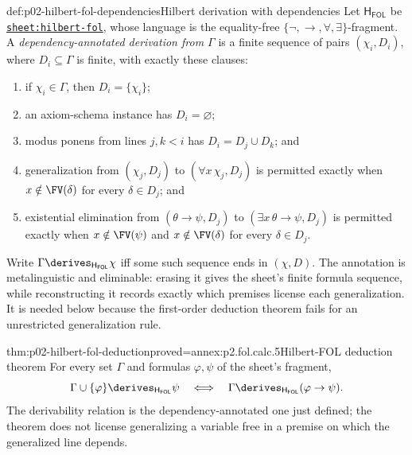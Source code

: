 \begin{hbdefinition}{def:p02-hilbert-fol-dependencies}{Hilbert derivation with dependencies}
Let \(\mathsf H_{\mathsf{FOL}}\) be
\hyperref[sheet:hilbert-fol]{\texttt{sheet:hilbert-fol}}, whose language is
the equality-free \(\{\neg,\to,\forall,\exists\}\)-fragment.  A
\emph{dependency-annotated derivation from \(\Gamma\)}
 is a finite sequence
of pairs \((\chi_i,D_i)\), where \(D_i\subseteq\Gamma\) is finite, with
exactly these clauses:
\begin{enumerate}
  \item if \(\chi_i\in\Gamma\), then \(D_i=\{\chi_i\}\);
  \item an axiom-schema instance has \(D_i=\varnothing\);
  \item modus ponens from lines \(j,k<i\) has
        \(D_i=D_j\cup D_k\); and
  \item generalization from \((\chi_j,D_j)\) to
        \((\forall x\,\chi_j,D_j)\) is permitted exactly when
        \(x\notin\FV(\delta)\) for every \(\delta\in D_j\); and
  \item existential elimination from
        \((\theta\to\psi,D_j)\) to
        \((\exists x\,\theta\to\psi,D_j)\) is permitted exactly when
        \(x\notin\FV(\psi)\) and
        \(x\notin\FV(\delta)\) for every \(\delta\in D_j\).
\end{enumerate}
Write \(\Gamma\derives_{\mathsf H_{\mathsf{FOL}}}\chi\) iff some such
sequence ends in \((\chi,D)\).  The annotation is metalinguistic and
eliminable: erasing it gives the sheet's finite formula sequence, while
reconstructing it records exactly which premises license each generalization.
It is needed below because the first-order deduction theorem fails for an
unrestricted generalization rule.
\end{hbdefinition}

\begin{hbtheorem}{thm:p02-hilbert-fol-deduction}{proved=annex:p2.fol.calc.5}{Hilbert-FOL deduction theorem}
For every set \(\Gamma\) and formulas \(\varphi,\psi\) of the sheet's
fragment,
\[
 \Gamma\cup\{\varphi\}
   \derives_{\mathsf H_{\mathsf{FOL}}}\psi
 \quad\Longleftrightarrow\quad
 \Gamma\derives_{\mathsf H_{\mathsf{FOL}}}(\varphi\to\psi).
\]
The derivability relation is the dependency-annotated one just defined; the
theorem does not license generalizing a variable free in a premise on which
the generalized line depends.
\end{hbtheorem}

